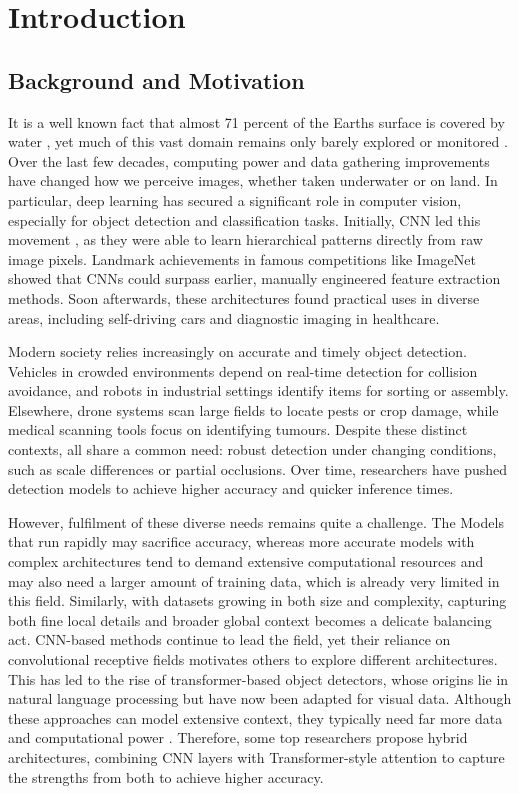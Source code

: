 
\chapter{Introduction}
\section{Background and Motivation}
It is a well known fact that almost 71 percent of the Earths surface is covered by water  \cite{usgs_water_coverage}, yet much of this vast domain remains only barely explored or monitored  \cite{krishnan2021underwater}. Over the last few decades, computing power and data gathering improvements have changed how we perceive images, whether taken underwater or on land. In particular, deep learning has secured a significant role in computer vision, especially for object detection and classification tasks. Initially, CNN led this movement \cite{easyodm2024cnn}, as they were able to learn hierarchical patterns directly from raw image pixels. Landmark achievements in famous competitions like ImageNet showed that CNNs could surpass earlier, manually engineered feature extraction methods. \cite{viso2025object, mdpi2025survey,paperswithcode2020detr} Soon afterwards, these architectures found practical uses in diverse areas, including self-driving cars and diagnostic imaging in healthcare.
    
Modern society relies increasingly on accurate and timely object detection.\cite{viso2025object} Vehicles in crowded environments depend on real-time detection for collision avoidance, and robots in industrial settings identify items for sorting or assembly. Elsewhere, drone systems scan large fields to locate pests or crop damage, while medical scanning tools focus on identifying tumours. Despite these distinct contexts, all share a common need: robust detection under changing conditions, such as scale differences or partial occlusions. Over time, researchers have pushed detection models to achieve higher accuracy and quicker inference times.

However, fulfilment of these diverse needs remains quite a challenge. The Models that run rapidly may sacrifice accuracy, whereas more accurate models with complex architectures tend to demand extensive computational resources and may also need a larger amount of training data, which is already very limited in this field. Similarly, with datasets growing in both size and complexity, capturing both fine local details and broader global context becomes a delicate balancing act. CNN-based methods continue to lead the field, yet their reliance on convolutional receptive fields motivates others to explore different architectures. This has led to the rise of transformer-based object detectors, whose origins lie in natural language processing but have now been adapted for visual data. Although these approaches can model extensive context, they typically need far more data and computational power \cite{edgeaivision2024vision}. Therefore, some top researchers propose hybrid architectures, combining CNN layers with Transformer-style attention to capture the strengths from both to achieve higher accuracy.

